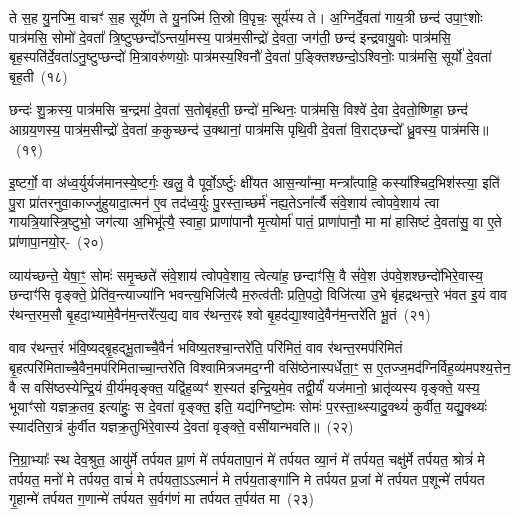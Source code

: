 ते स॒ह यु॒नज्मि॒ वाचꣳ॑ स॒ह सूर्ये॑ण ते यु॒नज्मि॑ ति॒स्रो वि॒पृचः॒ सूर्य॑स्य ते। अ॒ग्निर्दे॒वता॑ गाय॒त्री छन्द॑ उपा॒ꣳ॒शोः पात्र॑मसि॒ सोमो॑ दे॒वता᳚ त्रि॒ष्टुप्छन्दो᳚\-ऽन्तर्या॒मस्य॒ पात्र॑म॒सीन्द्रो॑ दे॒वता॒ जग॑ती॒ छन्द॑ इन्द्रवायु॒वोः पात्र॑मसि॒ बृह॒स्पति॑र्दे॒वता॑\-ऽनु॒ष्टुप्छन्दो॑ मि॒त्रावरु॑णयोः॒ पात्र॑मस्य॒श्विनौ॑ दे॒वता॑ प॒ङ्क्तिश्छन्दो॒\-ऽश्विनोः॒ पात्र॑मसि॒ सूर्यो॑ दे॒वता॑ बृह॒ती~(१८)\ip

छन्दः॑ शु॒क्रस्य॒ पात्र॑मसि च॒न्द्रमा॑ दे॒वता॑ स॒तोबृ॑हती॒ छन्दो॑ म॒न्थिनः॒ पात्र॑मसि॒ विश्वे॑ दे॒वा दे॒वतो॒ष्णिहा॒ छन्द॑ आग्रय॒णस्य॒ पात्र॑म॒सीन्द्रो॑ दे॒वता॑ क॒कुच्छन्द॑ उ॒क्थानां॒ पात्र॑मसि पृथि॒वी दे॒वता॑ वि॒राट्छन्दो᳚ ध्रु॒वस्य॒ पात्र॑मसि॥~(१९)\ip

{\anuvakamend[{अ॒न्तरि॑क्षेण बृह॒ती त्रय॑स्त्रिꣳशच्च}]}

इ॒ष्टर्गो॒ वा अ॑ध्व॒र्युर्यज॑मानस्ये॒ष्टर्गः॒ खलु॒ वै पूर्वो॒\-ऽर्ष्टुः क्षी॑यत आस॒न्या᳚न्मा॒ मन्त्रा᳚त्पाहि॒ कस्या᳚श्चिद॒भिश॑स्त्या॒ इति॑ पु॒रा प्रा॑तरनुवा॒काज्जु॑हुयादा॒त्मन॑ ए॒व तद॑ध्व॒र्युः पु॒रस्ता॒च्छर्म॑ नह्य॒ते\-ऽना᳚र्त्यै संवे॒शाय॑ त्वोपवे॒शाय॑ त्वा गायत्रि॒यास्त्रि॒ष्टुभो॒ जग॑त्या अ॒भिभू᳚त्यै॒ स्वाहा॒ प्राणा॑पानौ मृ॒त्योर्मा॑ पातं॒ प्राणा॑पानौ॒ मा मा॑ हासिष्टं दे॒वता॑सु॒ वा ए॒ते प्रा॑णापा॒नयो॒र्-~(२०)\ip

व्याय॑च्छन्ते॒ येषा॒ꣳ॒ सोमः॑ समृ॒च्छते॑ संवे॒शाय॑ त्वोपवे॒शाय॒ त्वेत्या॑ह॒ छन्दाꣳ॑सि॒ वै सं॑वे॒श उ॑पवे॒शश्छन्दो॑भिरे॒वास्य॒ छन्दाꣳ॑सि वृङ्क्ते॒ प्रेति॑व॒न्त्याज्या॑नि भवन्त्य॒भिजि॑त्यै म॒रुत्व॑तीः प्रति॒पदो॒ विजि॑त्या उ॒भे बृ॑हद्रथन्त॒रे भ॑वत इ॒यं वाव र॑थन्त॒रम॒सौ बृ॒हदा॒भ्यामे॒वैन॑म॒न्तरे᳚त्य॒द्य वाव र॑थन्त॒रꣴ श्वो बृ॒हद॑द्या॒श्वादे॒वैन॑म॒न्तरे॑ति भू॒तं~(२१)\ip

वाव र॑थन्त॒रं भ॑वि॒ष्यद्बृ॒हद्भू॒ताच्चै॒वैनं॑ भविष्य॒तश्चा॒न्तरे॑ति॒ परि॑मितं॒ वाव र॑थन्त॒रमप॑रिमितं बृ॒हत्परि॑मिताच्चै॒वैन॒मप॑रि\-मिताच्चा॒न्तरे॑ति विश्वामित्रजमद॒ग्नी वसि॑ष्ठेनास्पर्धेता॒ꣳ॒ स ए॒तज्ज॒मद॑ग्निर्विह॒व्य॑मपश्य॒त्तेन॒ वै स वसि॑ष्ठस्येन्द्रि॒यं वी॒र्य॑मवृङ्क्त॒ यद्वि॑ह॒व्यꣳ॑ श॒स्यत॑ इन्द्रि॒यमे॒व तद्वी॒र्यं॑ यज॑मानो॒ भ्रातृ॑व्यस्य वृङ्क्ते॒ यस्य॒ भूयाꣳ॑सो यज्ञक्र॒तव॒ इत्या॑हुः॒ स दे॒वता॑ वृङ्क्त॒ इति॒ यद्य॑ग्निष्टो॒मः सोमः॑ प॒रस्ता॒थ्स्यादु॒क्थ्यं॑ कुर्वीत॒ यद्यु॒क्थ्यः॑ स्याद॑तिरा॒त्रं कु॑र्वीत यज्ञक्र॒तुभि॑रे॒वास्य॑ दे॒वता॑ वृङ्क्ते॒ वसी॑यान्भवति॥~(२२)\ip

{\anuvakamend[{प्रा॒णा॒पा॒नयो᳚र्भू॒तं वृ॑ङ्क्ते॒\-ऽष्टाविꣳ॑शतिश्च}]}

नि॒ग्रा॒भ्याः᳚ स्थ देव॒श्रुत॒ आयु॑र्मे तर्पयत प्रा॒णं मे॑ तर्पयतापा॒नं मे॑ तर्पयत व्या॒नं मे॑ तर्पयत॒ चक्षु॑र्मे तर्पयत॒ श्रोत्रं॑ मे तर्पयत॒ मनो॑ मे तर्पयत॒ वाचं॑ मे तर्पयता॒\-ऽऽ\-त्मानं॑ मे तर्पय॒ताङ्गा॑नि मे तर्पयत प्र॒जां मे॑ तर्पयत प॒शून्मे॑ तर्पयत गृ॒हान्मे॑ तर्पयत ग॒णान्मे॑ तर्पयत स॒र्वग॑णं मा तर्पयत त॒र्पय॑त मा~(२३)\ip

